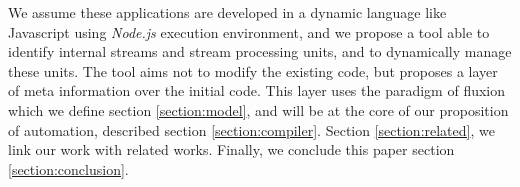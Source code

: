 We assume these applications are developed in a dynamic language like Javascript using \textit{Node.js} execution environment, and we propose a tool able to identify internal streams and stream processing units, and to dynamically manage these units.
The tool aims not to modify the existing code, but proposes a layer of meta information over the initial code.
This layer uses the paradigm of fluxion which we define section \ref{section:model}, and will be at the core of our proposition of automation, described section \ref{section:compiler}.
Section \ref{section:related}, we link our work with related works.
Finally, we conclude this paper section \ref{section:conclusion}.